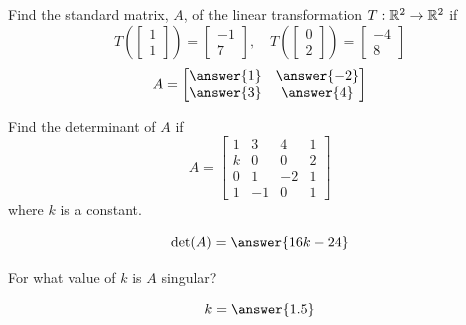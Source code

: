 \documentclass{ximera}
\begin{document}
\begin{exercise}
Find the standard matrix, $A$, of the linear transformation $T:\mathbb{R}^2\rightarrow \mathbb{R}^2$ if $$T\left(\begin{bmatrix}1\\1\end{bmatrix}\right)=\begin{bmatrix}-1\\7\end{bmatrix},\quad T\left(\begin{bmatrix}0\\2\end{bmatrix}\right)=\begin{bmatrix}-4\\8\end{bmatrix}$$
$$A=\begin{bmatrix}\answer{1} & \answer{-2}\\\answer{3} & \answer{4}\end{bmatrix}$$

\end{exercise}

\begin{exercise}
Find the determinant of $A$ if 
$$A=\begin{bmatrix}1 & 3 & 4 & 1\\k & 0 & 0 & 2\\0 & 1 & -2 & 1\\1 & -1 & 0 & 1\end{bmatrix}$$
where $k$ is a constant.

$$\mbox{det}(A)=\answer{16k-24}$$

For what value of $k$ is $A$ singular?

$$k=\answer{1.5}$$
 \end{exercise}



\end{document}
